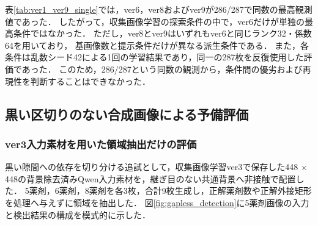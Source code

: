 \documentclass[uplatex,dvipdfmx]{jsarticle}
\begin{document}
表\ref{tab:ver1_ver9_single}では，ver6，ver8およびver9が286/287で同数の最高観測値であった．
したがって，収集画像学習の探索条件の中で，ver6だけが単独の最高条件ではなかった．
ただし，ver8とver9はいずれもver6と同じランク32・係数64を用いており，
基画像数と提示条件だけが異なる派生条件である．
また，各条件は乱数シード42による1回の学習結果であり，同一の287枚を反復使用した評価であった．
このため，286/287という同数の観測から，条件間の優劣および再現性を判断することはできなかった．

\subsection{黒い区切りのない合成画像による予備評価}

\subsubsection{ver3入力素材を用いた領域抽出だけの評価}\label{sec:zero_gap_detection}

黒い隙間への依存を切り分ける追試として，収集画像学習ver3で保存した448 $\times$ 448の背景除去済みQwen入力素材を，継ぎ目のない共通背景へ非接触で配置した．
5薬剤，6薬剤，8薬剤を各3枚，合計9枚生成し，正解薬剤数や正解外接矩形を処理へ与えずに領域を抽出した．
図\ref{fig:gapless_detection}に5薬剤画像の入力と検出結果の構成を模式的に示した．
\end{document}
